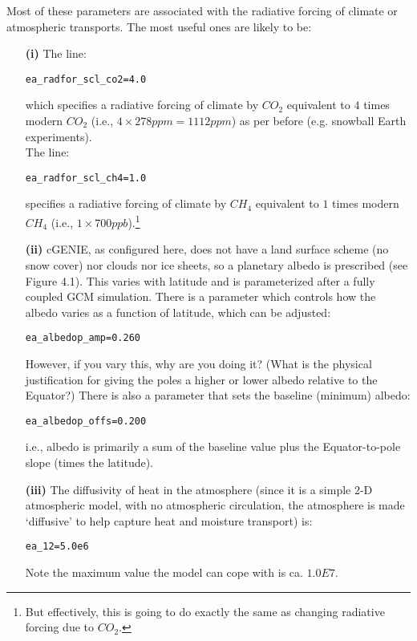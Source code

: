 \documentclass[11pt,fleqn]{book} %
\begin{document}
Most of these parameters are associated with the radiative forcing of climate or atmospheric transports. The most useful ones are likely to be:

\begin{itemize}[noitemsep]

\item[\textbf{(i)}] The line:
\begin{verbatim}
ea_radfor_scl_co2=4.0
\end{verbatim}
which specifies a radiative forcing of climate by \(CO_{2}\) equivalent to \(4\) times modern \(CO_{2}\) (i.e., \(4\times278 ppm = 1112 ppm\)) as per before (e.g. snowball Earth experiments).
\\The line:
\begin{verbatim}
ea_radfor_scl_ch4=1.0
\end{verbatim}
specifies a radiative forcing of climate by \(CH_{4}\) equivalent to \(1\) times modern \(CH_{4}\) (i.e., \(1\times700 ppb\)).\footnote{But effectively, this is going to do exactly the same as changing radiative forcing due to \(CO_{2}\).}

\item[\textbf{(ii)}] cGENIE, as configured here, does not have a land surface scheme (no snow cover) nor clouds nor ice sheets, so a planetary albedo is prescribed (see Figure 4.1). This varies with latitude and is parameterized after a fully coupled GCM simulation. There is a parameter which controls how the albedo varies as a function of latitude, which can be adjusted:
\begin{verbatim}
ea_albedop_amp=0.260
\end{verbatim}
However, if you vary this, why are you doing it? (What is the physical justification for giving the poles a higher or lower albedo relative to the Equator?)
There is also a parameter that sets the baseline (minimum) albedo:
\begin{verbatim}
ea_albedop_offs=0.200
\end{verbatim}
i.e., albedo is primarily a sum of the baseline value plus the Equator-to-pole slope (times the latitude).

\item[\textbf{(iii)}] The diffusivity of heat in the atmosphere (since it is a simple 2-D atmospheric model, with no atmospheric circulation, the atmosphere is made ‘diffusive’ to help capture heat and moisture transport) is:
\begin{verbatim}
ea_12=5.0e6
\end{verbatim}
Note the maximum value the model can cope with is ca. \(1.0E7\).

\end{itemize}
\end{document}
